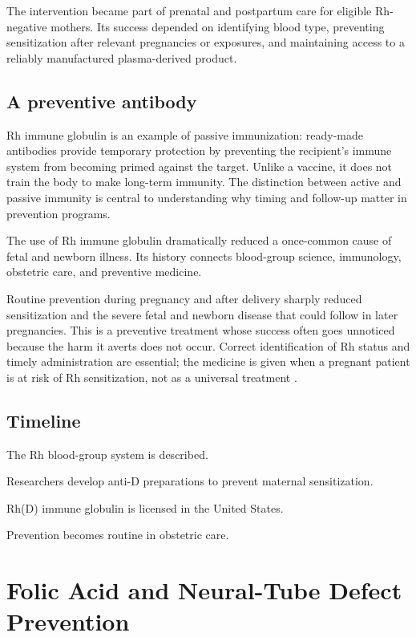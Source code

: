 \documentclass[12pt,oneside]{book}
\begin{document}
The intervention became part of prenatal and postpartum care for eligible
Rh-negative mothers. Its success depended on identifying blood type,
preventing sensitization after relevant pregnancies or exposures, and
maintaining access to a reliably manufactured plasma-derived product.

\section{A preventive antibody}
Rh immune globulin is an example of passive immunization: ready-made antibodies provide temporary protection by preventing the recipient's immune system from becoming primed against the target. Unlike a vaccine, it does not train the body to make long-term immunity. The distinction between active and passive immunity is central to understanding why timing and follow-up matter in prevention programs.

The use of Rh immune globulin dramatically reduced a once-common cause of
fetal and newborn illness. Its history connects blood-group science,
immunology, obstetric care, and preventive medicine.

Routine prevention during pregnancy and after delivery sharply reduced
sensitization and the severe fetal and newborn disease that could follow in
later pregnancies. This is a preventive treatment whose success often goes
unnoticed because the harm it averts does not occur. Correct identification of
Rh status and timely administration are essential; the medicine is given when
a pregnant patient is at risk of Rh sensitization, not as a universal
treatment \cite{cdcRhHistory,dailymedRhIG}.

\section*{Timeline}
\begin{description}[leftmargin=2.3cm,style=nextline]
  \item[1940] The Rh blood-group system is described.
  \item[1950s--1960s] Researchers develop anti-D preparations to prevent maternal sensitization.
  \item[1968] Rh(D) immune globulin is licensed in the United States.
  \item[Late twentieth century] Prevention becomes routine in obstetric care.
\end{description}
\chapter[Folic Acid and Neural-Tube Defect Prevention]{Folic Acid and Neural-Tube Defect Prevention}
\end{document}
